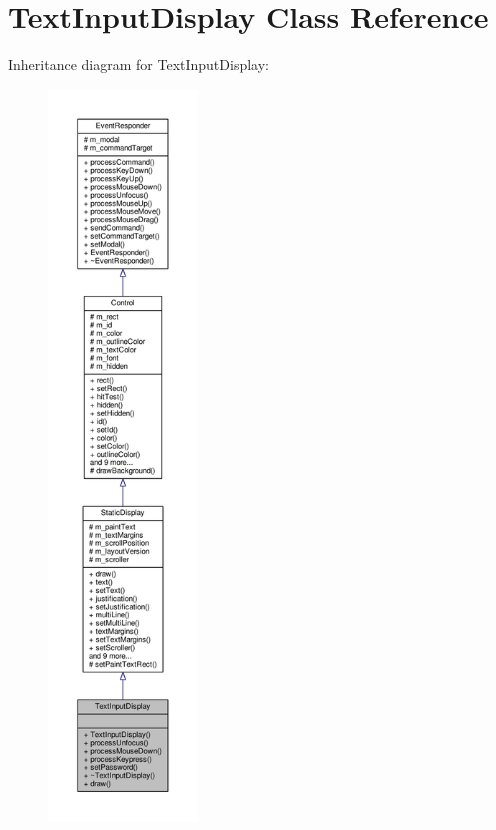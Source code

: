 \hypertarget{classTextInputDisplay}{}\section{Text\+Input\+Display Class Reference}
\label{classTextInputDisplay}


Inheritance diagram for Text\+Input\+Display\+:
\nopagebreak
\begin{figure}[H]
\begin{center}
\leavevmode
\includegraphics[height=550pt]{dd/dad/classTextInputDisplay__inherit__graph}
\end{center}
\end{figure}


